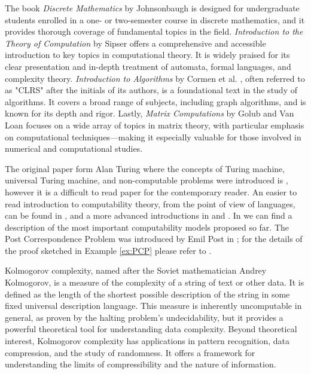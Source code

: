 The book \emph{Discrete Mathematics} by Johnsonbaugh \cite{johnsonbaugh2009discrete} is designed for undergraduate students enrolled in a one- or two-semester course in discrete mathematics, and it provides thorough coverage of fundamental topics in the field. \emph{Introduction to the Theory of Computation} by Sipser \cite{sipser2012introduction} offers a comprehensive and accessible introduction to key topics in computational theory. It is widely praised for its clear presentation and in-depth treatment of automata, formal languages, and complexity theory. \emph{Introduction to Algorithms} by Cormen et al. \cite{cormen1990introduction}, often referred to as "CLRS" after the initials of its authors, is a foundational text in the study of algorithms. It covers a broad range of subjects, including graph algorithms, and is known for its depth and rigor. Lastly, \emph{Matrix Computations} by Golub and Van Loan \cite{golub2013matrix} focuses on a wide array of topics in matrix theory, with particular emphasis on computational techniques—making it especially valuable for those involved in numerical and computational studies.


The original paper form Alan Turing where the concepts of Turing machine, universal Turing machine, and non-computable problems were introduced is \cite{turing1936computable}, however it is a difficult to read paper for the contemporary reader. An easier to read introduction to computability theory, from the point of view of languages, can be found in \cite{sipser2012introduction}, and a more advanced introductions in \cite{cooper2003computability} and \cite{soare2016turing}. In \cite{fernandez2009models} we can find a description of the most important computability models proposed so far. The Post Correspondence Problem was introduced by Emil Post in \cite{post1946variant}; for the details of the proof sketched in Example \ref{ex:PCP} please refer to \cite{sipser2012introduction}.


Kolmogorov complexity, named after the Soviet mathematician Andrey Kolmogorov, is a measure of the complexity of a string of text or other data. It is defined as the length of the shortest possible description of the string in some fixed universal description language. This measure is inherently uncomputable in general, as proven by the halting problem's undecidability, but it provides a powerful theoretical tool for understanding data complexity. Beyond theoretical interest, Kolmogorov complexity has applications in pattern recognition, data compression, and the study of randomness. It offers a framework for understanding the limits of compressibility and the nature of information.


